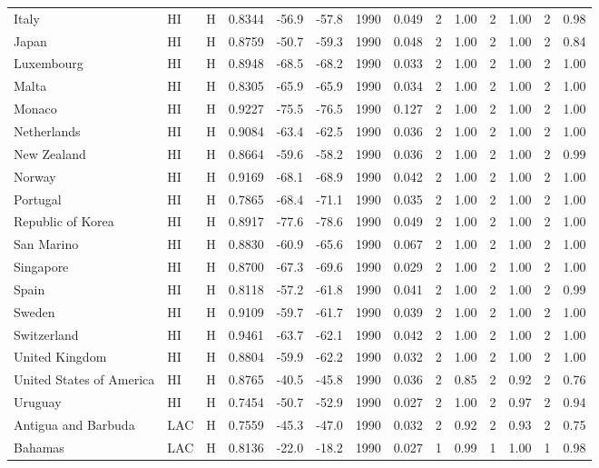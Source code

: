 \begin{longtable}{llrrrrrrrrrrrr}
Italy & HI & H & 0.8344 & -56.9 & -57.8 & 1990 & 0.049 & 2 & 1.00 & 2 & 1.00 & 2 & 0.98 \\
Japan & HI & H & 0.8759 & -50.7 & -59.3 & 1990 & 0.048 & 2 & 1.00 & 2 & 1.00 & 2 & 0.84 \\
Luxembourg & HI & H & 0.8948 & -68.5 & -68.2 & 1990 & 0.033 & 2 & 1.00 & 2 & 1.00 & 2 & 1.00 \\
Malta & HI & H & 0.8305 & -65.9 & -65.9 & 1990 & 0.034 & 2 & 1.00 & 2 & 1.00 & 2 & 1.00 \\
Monaco & HI & H & 0.9227 & -75.5 & -76.5 & 1990 & 0.127 & 2 & 1.00 & 2 & 1.00 & 2 & 1.00 \\
Netherlands & HI & H & 0.9084 & -63.4 & -62.5 & 1990 & 0.036 & 2 & 1.00 & 2 & 1.00 & 2 & 1.00 \\
New Zealand & HI & H & 0.8664 & -59.6 & -58.2 & 1990 & 0.036 & 2 & 1.00 & 2 & 1.00 & 2 & 0.99 \\
Norway & HI & H & 0.9169 & -68.1 & -68.9 & 1990 & 0.042 & 2 & 1.00 & 2 & 1.00 & 2 & 1.00 \\
Portugal & HI & H & 0.7865 & -68.4 & -71.1 & 1990 & 0.035 & 2 & 1.00 & 2 & 1.00 & 2 & 1.00 \\
Republic of Korea & HI & H & 0.8917 & -77.6 & -78.6 & 1990 & 0.049 & 2 & 1.00 & 2 & 1.00 & 2 & 1.00 \\
San Marino & HI & H & 0.8830 & -60.9 & -65.6 & 1990 & 0.067 & 2 & 1.00 & 2 & 1.00 & 2 & 1.00 \\
Singapore & HI & H & 0.8700 & -67.3 & -69.6 & 1990 & 0.029 & 2 & 1.00 & 2 & 1.00 & 2 & 1.00 \\
Spain & HI & H & 0.8118 & -57.2 & -61.8 & 1990 & 0.041 & 2 & 1.00 & 2 & 1.00 & 2 & 0.99 \\
Sweden & HI & H & 0.9109 & -59.7 & -61.7 & 1990 & 0.039 & 2 & 1.00 & 2 & 1.00 & 2 & 1.00 \\
Switzerland & HI & H & 0.9461 & -63.7 & -62.1 & 1990 & 0.042 & 2 & 1.00 & 2 & 1.00 & 2 & 1.00 \\
United Kingdom & HI & H & 0.8804 & -59.9 & -62.2 & 1990 & 0.032 & 2 & 1.00 & 2 & 1.00 & 2 & 1.00 \\
United States of America & HI & H & 0.8765 & -40.5 & -45.8 & 1990 & 0.036 & 2 & 0.85 & 2 & 0.92 & 2 & 0.76 \\
Uruguay & HI & H & 0.7454 & -50.7 & -52.9 & 1990 & 0.027 & 2 & 1.00 & 2 & 0.97 & 2 & 0.94 \\
Antigua and Barbuda & LAC & H & 0.7559 & -45.3 & -47.0 & 1990 & 0.032 & 2 & 0.92 & 2 & 0.93 & 2 & 0.75 \\
Bahamas & LAC & H & 0.8136 & -22.0 & -18.2 & 1990 & 0.027 & 1 & 0.99 & 1 & 1.00 & 1 & 0.98 \\

\end{longtable}
